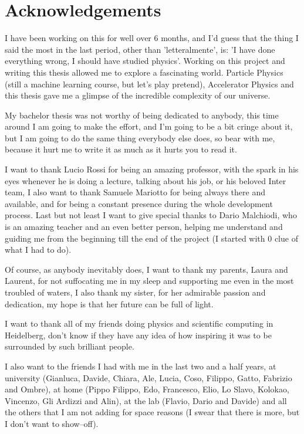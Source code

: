 \chapter*{Acknowledgements}
I have been working on this for well over $6$ months, and I'd guess that the thing I said
the most in the last period, other than 'letteralmente', is: 'I have done everything wrong, I should
have studied physics'. Working on this project and writing this thesis allowed me to explore a
fascinating world. Particle Physics (still a machine learning course, but let's play pretend), Accelerator Physics and this thesis gave me a glimpse of the incredible complexity of our universe.

\smallskip

My bachelor thesis was not worthy of being dedicated to anybody, this time around I am going to make
the effort, and I'm going to be a bit cringe about it, but I am going to do the same thing everybody
else does, so bear with me, because it hurt me to write it as much as it hurts you to read it.

\medskip

I want to thank Lucio Rossi for being an amazing professor, with the spark in his eyes whenever he
is doing a lecture, talking about his job, or his beloved Inter team, I also want to thank Samuele
Mariotto for being always there and available, and for being a constant presence during the whole
development process. Last but not least I want to give special thanks to Dario Malchiodi, who is an
amazing teacher and an even better person, helping me understand and guiding me from the beginning
till the end of the project (I started with $0$ clue of what I had to do).

\smallskip

Of course, as anybody inevitably does, I want to thank my parents, Laura and Laurent, for not
suffocating me in my sleep and supporting me even in the most troubled of waters, I also thank my
sister, for her admirable passion and dedication, my hope is that her future can be full of light.

I want to thank all of my friends doing physics and scientific computing in Heidelberg, don't know
if they have any idea of how inspiring it was to be surrounded by such brilliant people.

I also want to the friends I had with me in the last two and a half years, at university (Gianluca,
Davide, Chiara, Ale, Lucia, Coso, Filippo, Gatto, Fabrizio and Ombre), at home (Pippo Filippo, Edo,
Francesco, Elio, Lo Slavo, Kolokao, Vincenzo, Gli Ardizzi and Alin), at the lab (Flavio,
Dario and Davide) and all the others that I am not adding for space reasons (I swear that there
is more, but I don't want to show--off).

